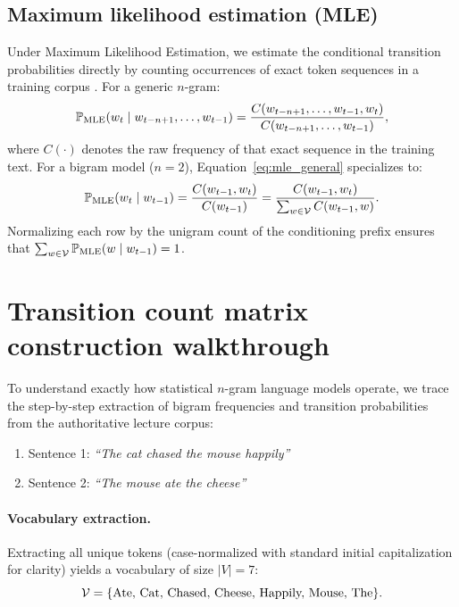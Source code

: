 \documentclass[../../main.tex]{subfiles}
\begin{document}
\subsection{Maximum likelihood estimation (MLE)}
Under Maximum Likelihood Estimation, we estimate the conditional transition probabilities directly by counting occurrences of exact token sequences in a training corpus \cite{jurafsky2024}. For a generic $n$-gram:
\begin{equation}
\label{eq:mle_general}
\mathbb{P}_{\text{MLE}}(w_t \mid w_{t-n+1}, \dots, w_{t-1}) = \frac{C(w_{t-n+1}, \dots, w_{t-1}, w_t)}{C(w_{t-n+1}, \dots, w_{t-1})},
\end{equation}
where $C(\cdot)$ denotes the raw frequency of that exact sequence in the training text. For a bigram model ($n=2$), Equation~\eqref{eq:mle_general} specializes to:
\begin{equation}
\label{eq:mle_bigram}
\mathbb{P}_{\text{MLE}}(w_t \mid w_{t-1}) = \frac{C(w_{t-1}, w_t)}{C(w_{t-1})} = \frac{C(w_{t-1}, w_t)}{\sum_{w \in \mathcal{V}} C(w_{t-1}, w)}.
\end{equation}
Normalizing each row by the unigram count of the conditioning prefix ensures that $\sum_{w \in \mathcal{V}} \mathbb{P}_{\text{MLE}}(w \mid w_{t-1}) = 1$.


\clearpage
\section{Transition count matrix construction walkthrough}
\label{sec:count_matrix}

To understand exactly how statistical $n$-gram language models operate, we trace the step-by-step extraction of bigram frequencies and transition probabilities from the authoritative lecture corpus:
\begin{enumerate}
    \item Sentence 1: \textit{``The cat chased the mouse happily''}
    \item Sentence 2: \textit{``The mouse ate the cheese''}
\end{enumerate}

\paragraph{Vocabulary extraction.}
Extracting all unique tokens (case-normalized with standard initial capitalization for clarity) yields a vocabulary of size $|V| = 7$:
\[
\mathcal{V} = \{\text{Ate, Cat, Chased, Cheese, Happily, Mouse, The}\}.
\]
\end{document}
